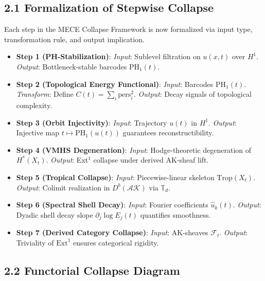 \documentclass[11pt]{article}
\begin{document}
\subsection*{2.1 Formalization of Stepwise Collapse}

Each step in the MECE Collapse Framework is now formalized via input type, transformation rule, and output implication.

\begin{itemize}
  \item \textbf{Step 1 (PH-Stabilization)}:  
  \emph{Input}: Sublevel filtration on $u(x,t)$ over $H^1$.  
  \emph{Output}: Bottleneck-stable barcodes $\mathrm{PH}_1(t)$.

  \item \textbf{Step 2 (Topological Energy Functional)}:  
  \emph{Input}: Barcodes $\mathrm{PH}_1(t)$.  
  \emph{Transform}: Define $C(t) = \sum_i \text{pers}_i^2$.  
  \emph{Output}: Decay signals of topological complexity.

  \item \textbf{Step 3 (Orbit Injectivity)}:  
  \emph{Input}: Trajectory $u(t)$ in $H^1$.  
  \emph{Output}: Injective map $t \mapsto \mathrm{PH}_1(u(t))$ guarantees reconstructibility.

  \item \textbf{Step 4 (VMHS Degeneration)}:  
  \emph{Input}: Hodge-theoretic degeneration of $H^*(X_t)$.  
  \emph{Output}: Ext$^1$ collapse under derived AK-sheaf lift.

  \item \textbf{Step 5 (Tropical Collapse)}:  
  \emph{Input}: Piecewise-linear skeleton $\mathrm{Trop}(X_t)$.  
  \emph{Output}: Colimit realization in $D^b(\mathcal{AK})$ via $\mathbb{T}_d$.

  \item \textbf{Step 6 (Spectral Shell Decay)}:  
  \emph{Input}: Fourier coefficients $\hat{u}_k(t)$.  
  \emph{Output}: Dyadic shell decay slope $\partial_j \log E_j(t)$ quantifies smoothness.

  \item \textbf{Step 7 (Derived Category Collapse)}:  
  \emph{Input}: AK-sheaves $\mathcal{F}_t$.  
  \emph{Output}: Triviality of $\mathrm{Ext}^1$ ensures categorical rigidity.
\end{itemize}

\subsection*{2.2 Functorial Collapse Diagram}
\end{document}
